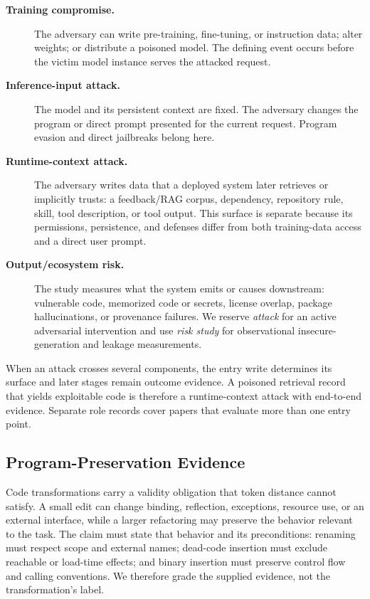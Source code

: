 \documentclass[acmsmall,screen,review]{acmart}
\begin{document}
\begin{description}
\item[\textbf{Training compromise.}] The adversary can write pre-training, fine-tuning, or instruction data; alter weights; or distribute a poisoned model. The defining event occurs before the victim model instance serves the attacked request.
\item[\textbf{Inference-input attack.}] The model and its persistent context are fixed.  The adversary changes the program or direct prompt presented for the current request.  Program evasion and direct jailbreaks belong here.
\item[\textbf{Runtime-context attack.}] The adversary writes data that a deployed system later retrieves or implicitly trusts: a feedback/RAG corpus, dependency, repository rule, skill, tool description, or tool output.  This surface is separate because its permissions, persistence, and defenses differ from both training-data access and a direct user prompt.
\item[\textbf{Output/ecosystem risk.}] The study measures what the system emits or causes downstream: vulnerable code, memorized code or secrets, license overlap, package hallucinations, or provenance failures.  We reserve \emph{attack} for an active adversarial intervention and use \emph{risk study} for observational insecure-generation and leakage measurements.
\end{description}

When an attack crosses several components, the entry write determines its surface and later stages remain outcome evidence. A poisoned retrieval record that yields exploitable code is therefore a runtime-context attack with end-to-end evidence. Separate role records cover papers that evaluate more than one entry point.

\subsection{Program-Preservation Evidence} \label{sec:threat:semantics}
Code transformations carry a validity obligation that token distance cannot satisfy. A small edit can change binding, reflection, exceptions, resource use, or an external interface, while a larger refactoring may preserve the behavior relevant to the task. The claim must state that behavior and its preconditions: renaming must respect scope and external names; dead-code insertion must exclude reachable or load-time effects; and binary insertion must preserve control flow and calling conventions. We therefore grade the supplied evidence, not the transformation's label.
\end{document}
